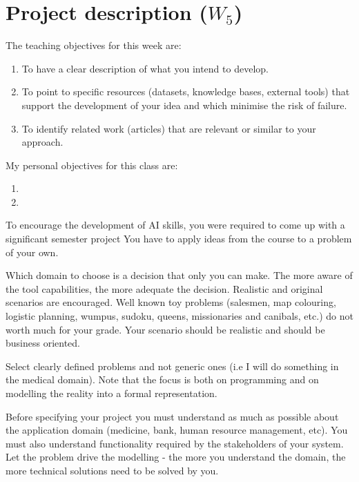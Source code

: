 \documentclass[a4paper,12pt]{report}
\begin{document}
\vspace{0.5cm}



\chapter{Project description ($W_5$)}

The teaching objectives for this week are:
\begin{enumerate}
 \item To have a clear description of what you intend to develop.
\item To point to specific resources (datasets, knowledge bases, external tools) 
that support the development of your idea and which minimise the risk of failure.
\item To identify related work (articles) that are relevant or similar to your approach.
\end{enumerate}

\vspace{0.5cm}

My personal objectives for this class are:
\begin{enumerate}
 \item 
 \item 
\end{enumerate}


To encourage the development of AI skills, 
you  were required to come up with a significant semester project 
You have to  apply ideas from the course to a problem of your own.

Which domain to choose is a decision that only you can make. 
The more aware of the tool capabilities, the more adequate the decision.
Realistic and original scenarios are encouraged. 
Well known toy problems (salesmen, map colouring, logistic planning, wumpus, sudoku, queens, missionaries and canibals, etc.) do not worth much for your grade. 
Your scenario should be realistic and should be business oriented. 

Select clearly defined problems and not generic ones 
(i.e I will do something in the medical domain). 
Note that the focus is both on programming and on modelling the reality into a formal representation.


Before specifying your project you must understand as much as possible about the application domain (medicine, bank, human resource management, etc). 
You must also understand functionality required by the stakeholders of your system. 
Let the problem drive the modelling - the more you understand the domain, the more technical solutions need to be solved by you. 
\end{document}
